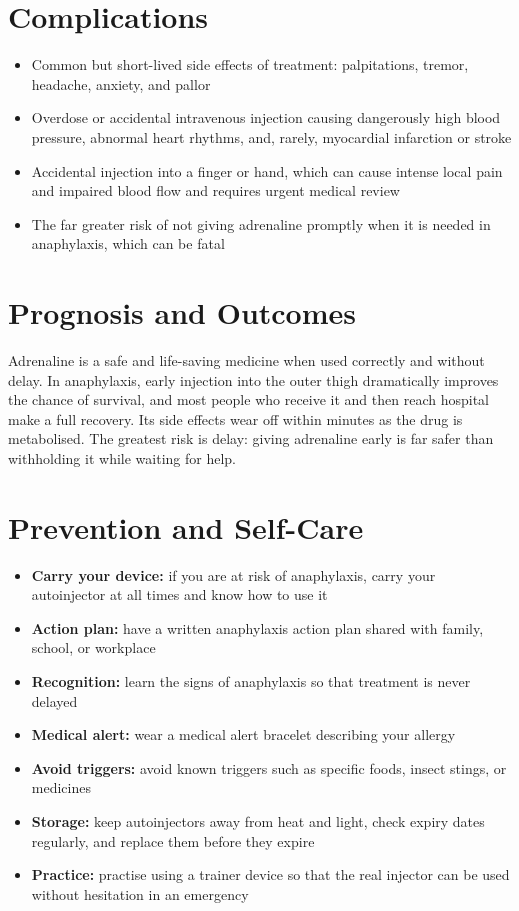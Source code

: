 \section*{Complications}
\begin{itemize}
    \item Common but short-lived side effects of treatment: palpitations, tremor, headache, anxiety, and pallor
    \item Overdose or accidental intravenous injection causing dangerously high blood pressure, abnormal heart rhythms, and, rarely, myocardial infarction or stroke
    \item Accidental injection into a finger or hand, which can cause intense local pain and impaired blood flow and requires urgent medical review
    \item The far greater risk of not giving adrenaline promptly when it is needed in anaphylaxis, which can be fatal
\end{itemize}

\section*{Prognosis and Outcomes}
Adrenaline is a safe and life-saving medicine when used correctly and without delay. In anaphylaxis, early injection into the outer thigh dramatically improves the chance of survival, and most people who receive it and then reach hospital make a full recovery. Its side effects wear off within minutes as the drug is metabolised. The greatest risk is delay: giving adrenaline early is far safer than withholding it while waiting for help.

\section*{Prevention and Self-Care}
\begin{itemize}
    \item \textbf{Carry your device:} if you are at risk of anaphylaxis, carry your autoinjector at all times and know how to use it
    \item \textbf{Action plan:} have a written anaphylaxis action plan shared with family, school, or workplace
    \item \textbf{Recognition:} learn the signs of anaphylaxis so that treatment is never delayed
    \item \textbf{Medical alert:} wear a medical alert bracelet describing your allergy
    \item \textbf{Avoid triggers:} avoid known triggers such as specific foods, insect stings, or medicines
    \item \textbf{Storage:} keep autoinjectors away from heat and light, check expiry dates regularly, and replace them before they expire
    \item \textbf{Practice:} practise using a trainer device so that the real injector can be used without hesitation in an emergency
\end{itemize}

